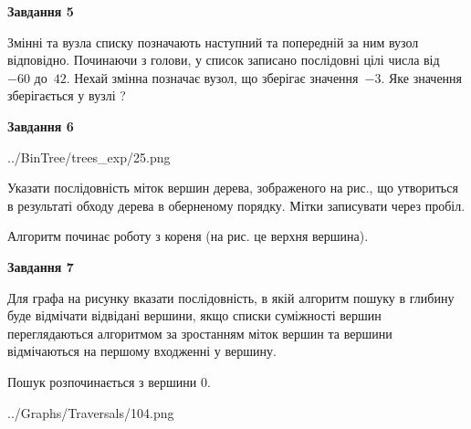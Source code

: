 \documentclass[12pt, ukrainian]{article}
\begin{document}
{\begin {large}
{\begin {center}\textbf{Завдання 5}\end {center}}\par
Змінні  та  вузла списку позначають наступний та попередній за ним вузол відповідно. Починаючи з голови, у список записано послідовні цілі числа від~$-60$ до~$42$. Нехай змінна  позначає вузол, що зберігає значення~$-3$.
Яке значення зберігається у вузлі  ?\par
\newpage

{\begin {center}\textbf{Завдання 6}\end {center}}\par

\begin{center}
	{../BinTree/trees_exp/25.png}
\end{center}
Указати послідовність міток вершин дерева, зображеного на рис., що утвориться в результаті обходу дерева в оберненому порядку. Мітки записувати через пробіл.\par Алгоритм починає роботу з кореня (на рис. це верхня вершина).\par
\newpage

{\begin {center}\textbf{Завдання 7}\end {center}}\par
Для графа на рисунку вказати послідовність, в якій алгоритм пошуку в глибину буде відмічати відвідані вершини, якщо списки суміжності вершин переглядаються алгоритмом за зростанням міток вершин та вершини відмічаються на першому вход\-женні у вершину.\par
Пошук розпочинається з вершини 0.\par

\begin{center}
	{../Graphs/Traversals/104.png}
\end{center}\par
\newpage


\end{large}}
\end{document}
